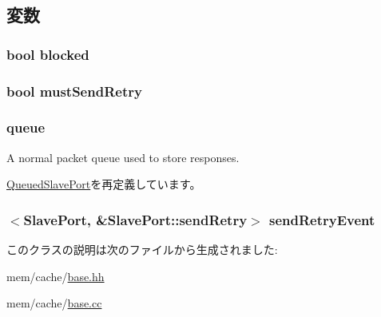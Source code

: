 \subsection{変数}
\hypertarget{classBaseCache_1_1CacheSlavePort_adf1dca7698b030895e9d81fc14cd9fd8}{
\subsubsection[{blocked}]{\setlength{\rightskip}{0pt plus 5cm}bool {\bf blocked}}}
\label{classBaseCache_1_1CacheSlavePort_adf1dca7698b030895e9d81fc14cd9fd8}
\hypertarget{classBaseCache_1_1CacheSlavePort_a63c00ff638681c3fdbaff0e3002674cd}{
\subsubsection[{mustSendRetry}]{\setlength{\rightskip}{0pt plus 5cm}bool {\bf mustSendRetry}}}
\label{classBaseCache_1_1CacheSlavePort_a63c00ff638681c3fdbaff0e3002674cd}
\hypertarget{classBaseCache_1_1CacheSlavePort_a3055168363a9ed42f38173363b6c1975}{
\subsubsection[{queue}]{ {\bf queue}}}
\label{classBaseCache_1_1CacheSlavePort_a3055168363a9ed42f38173363b6c1975}
A normal packet queue used to store responses. 

\hyperlink{classQueuedSlavePort_a89fcdbe2ab63d24f2112bc7e05bf2413}{QueuedSlavePort}を再定義しています。\hypertarget{classBaseCache_1_1CacheSlavePort_a797d0b8335772c15e0e45e2db624eb6c}{
\subsubsection[{sendRetryEvent}]{$<${\bf SlavePort}, \&SlavePort::sendRetry$>$ {\bf sendRetryEvent}}}
\label{classBaseCache_1_1CacheSlavePort_a797d0b8335772c15e0e45e2db624eb6c}


このクラスの説明は次のファイルから生成されました:\begin{DoxyCompactItemize}
\item 
mem/cache/\hyperlink{mem_2cache_2base_8hh}{base.hh}\item 
mem/cache/\hyperlink{mem_2cache_2base_8cc}{base.cc}\end{DoxyCompactItemize}
